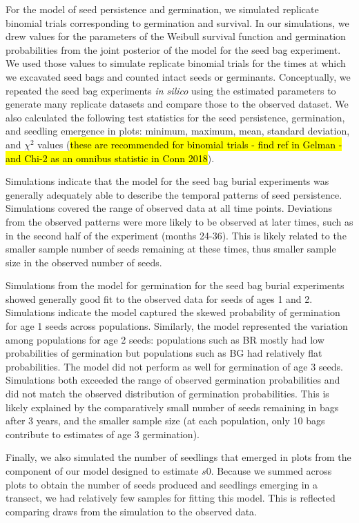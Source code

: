 \documentclass[12pt, oneside, titlepage]{article}   	%
\begin{document}
For the model of seed persistence and germination, we simulated replicate binomial trials corresponding to germination and survival. In our simulations, we drew values for the parameters of the Weibull survival function and germination probabilities from the joint posterior of the model for the seed bag experiment. We used those values to simulate replicate binomial trials for the times at which we excavated seed bags and counted intact seeds or germinants. Conceptually, we repeated the seed bag experiments \textit{in silico} using the estimated parameters to generate many replicate datasets and compare those to the observed dataset. We also calculated the following test statistics for the seed persistence, germination, and seedling emergence in plots: minimum, maximum, mean, standard deviation, and $\chi^2$ values (\hl{these are recommended for binomial trials - find ref in Gelman - and Chi-2 as an omnibus statistic in Conn 2018}).

Simulations indicate that the model for the seed bag burial experiments was generally adequately able to describe the temporal patterns of seed persistence. Simulations covered the range of observed data at all time points. Deviations from the observed patterns were more likely to be observed at later times, such as in the second half of the experiment (months 24-36). This is likely related to the smaller sample number of seeds remaining at these times, thus smaller sample size in the observed number of seeds.

Simulations from the model for germination for the seed bag burial experiments showed generally good fit to the observed data for seeds of ages 1 and 2. Simulations indicate the model captured the skewed probability of germination for age 1 seeds across populations. Similarly, the model represented the variation among populations for age 2 seeds: populations such as BR mostly had low probabilities of germination but populations such as BG had relatively flat probabilities. The model did not perform as well for germination of age 3 seeds. Simulations both exceeded the range of observed germination probabilities and did not match the observed distribution of germination probabilities. This is likely explained by the comparatively small number of seeds remaining in bags after 3 years, and the smaller sample size (at each population, only 10 bags contribute to estimates of age 3 germination).

Finally, we also simulated the number of seedlings that emerged in plots from the component of our model designed to estimate $s0$. Because we summed across plots to obtain the number of seeds produced and seedlings emerging in a transect, we had relatively few samples for fitting this model. This is reflected comparing draws from the simulation to the observed data.
\end{document}
